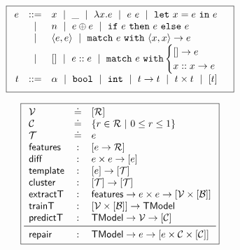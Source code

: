 \begin{figure}
\small
\centering
\begin{minipage}[c]{\linewidth}
  \[
  \boxed{
  \begin{array}{rcl}
  e & ::=    & x \ \mid\  \_  \ \mid\  \lambda x. e \ \mid\  e\ e \ \mid\  \mathtt{let}\ x = e\ \mathtt{in}\ e \\
    & \ \mid\  & n \ \mid\  e \oplus e \ \mid\  \mathtt{if}\ e\ \mathtt{then}\ e\ \mathtt{else}\ e \\
    & \ \mid\  & \langle e, e \rangle \ \mid\  \mathtt{match}\ e\ \mathtt{with}\ \langle x, x \rangle \to e \\
    & \ \mid\  & \mathtt{[]} \ \mid\  e :: e \ \mid\  \mathtt{match}\ e\ \mathtt{with} \begin{cases} \mathtt{[]} \to e\\ x :: x \to e \end{cases} \\[0.05in]

  t & ::= & \alpha \ \mid\  \mathtt{bool} \ \mid\  \mathtt{int} \ \mid\  t \to t \ \mid\  t \times t \ \mid\  [t] \\[0.05in]
  \end{array}
  }
  \]
  \label{fig:syntax}
\end{minipage}
\begin{minipage}[c]{\linewidth}
  \lstDeleteShortInline{|} %
  \[
  \boxed{
  \begin{array}{lcl}
    \V           & \defeq & \List{\R}\\
    \Runit       & \defeq & \{r \in \R\ |\ 0 \le r \le 1\} \\ %
    \T           & \defeq & e\\
    \featuresym  & : & \List{e \to \R} \\
    \diffsym     & : & e \times e \to \List{e} \\
    \templatesym & : & \List{e} \to \List{\T}\\
    \clustersym  & : & \List{\T} \to \List{\T}\\
    \extractTsym & : & \featuresym \to e \times e \to \List{\V \times \List{\B}} \\
    \trainTsym   & : & \List{\V \times \List{\B}} \to \ModelT \\
    \predictTsym & : & \ModelT \to \V \to \List{\Runit} \\
    \midrule
    \repairsym   & : & \ModelT \to e \to \List{e \times \Runit \times \List{\Runit}}
  \end{array}
  }
  \]
  \lstMakeShortInline{|}
  \label{fig:api}
\end{minipage}
\end{figure}
